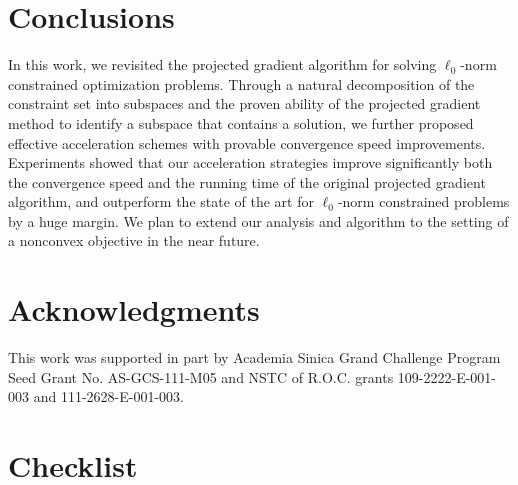 \documentclass{article}
\newcommand{\Alert}[1]{{ #1}}
\theoremstyle{plain}
\theoremstyle{definition}
\theoremstyle{remark}
\begin{document}
\section{Conclusions}
\label{sec:conclusion}
In this work, we revisited the projected gradient algorithm for solving 
$\ell_0$-norm constrained 
optimization problems. Through a natural decomposition of the constraint set into subspaces
and the proven ability of the projected gradient method to identify a subspace that contains a
solution,
we further proposed effective acceleration schemes with provable
convergence speed improvements.
Experiments showed that our acceleration strategies improve
significantly both the convergence speed and the running time of the
original projected gradient algorithm,
and outperform the state of the art for $\ell_0$-norm constrained
problems by a huge margin.
We plan to extend our analysis and algorithm to the setting of a
nonconvex objective in the near future.

\Alert{\section*{Acknowledgments}
This work was supported in part by Academia Sinica Grand Challenge
Program Seed Grant No. AS-GCS-111-M05 and 
NSTC of R.O.C. grants 109-2222-E-001-003 and 111-2628-E-001-003. }





\ifdefined\neurips
\section*{Checklist}
\end{document}
